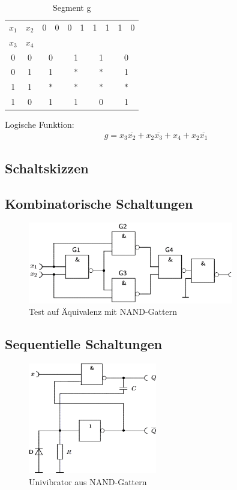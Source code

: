 \documentclass[numbers=noenddot,12pt,a4paper]{scrartcl}
\newcommand{\nicht}[1]{\overline{#1}}
\begin{document}
\begin{table}[H]
\centering
\begin{tabular}{cc||cc|cc|cc|cc}
$x_1$ & $x_2$ & 0 & 0 & 0 & 1 & 1 & 1 & 1 & 0 \\ \cline{0-1} 
$x_3$ & $x_4$ & & & & & & & & \\ \cline{1-10}
0 & 0 & \multicolumn{2}{|c|}{0} & \multicolumn{2}{|c|}{1} & \multicolumn{2}{|c|}{1} & \multicolumn{2}{|c}{0} \\
0 & 1 & \multicolumn{2}{|c|}{1} & \multicolumn{2}{|c|}{$\ast$} & \multicolumn{2}{|c|}{$\ast$} & \multicolumn{2}{|c}{1} \\ 
1 & 1 & \multicolumn{2}{|c|}{$\ast$} & \multicolumn{2}{|c|}{$\ast$} & \multicolumn{2}{|c|}{$\ast$} & \multicolumn{2}{|c}{$\ast$} \\ 
1 & 0 & \multicolumn{2}{|c|}{1} & \multicolumn{2}{|c|}{1} & \multicolumn{2}{|c|}{0} & \multicolumn{2}{|c}{1} \\ 
\end{tabular}
\caption{Segment g}
\end{table}
Logische Funktion:
\begin{align}
g=  x_3 \nicht{x_2}+ x_2 \nicht{x_3} + x_4 + x_2\nicht{x_1}
\end{align}

\subsection{Schaltskizzen}
\subsection{Kombinatorische Schaltungen}
\begin{figure}[H]
\centering
\includegraphics[width=0.8\textwidth]{gleichheit.png}
\caption{Test auf Äquivalenz mit NAND-Gattern}
\end{figure}
\subsection{Sequentielle Schaltungen}
\begin{figure}[H]
\centering
\includegraphics[width=0.5\textwidth]{univibrator.png}
\caption{Univibrator aus NAND-Gattern} \label{img:uni}
\end{figure}
\end{document}
